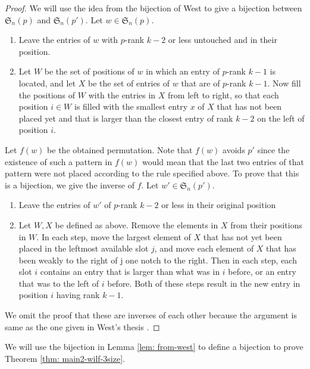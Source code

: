 \documentclass[12pt, english, a4paper]{article}
\newcommand{\Av}{\mathfrak{S}}
\theoremstyle{plain}
\theoremstyle{definition}
\theoremstyle{remark}
\begin{document}
\begin{proof}
     We will use the idea from the bijection of West \cite{west-thesis} to give a bijection between $\Av_n(p)$ and $\Av_n(p')$. Let $w\in \Av_n(p)$. 
    \begin{enumerate}
        \item[Step 1:] Leave the entries of $w$ with $p$-rank $k-2$ or less untouched and in their position.
        \item[Step 2:] Let $W$ be the set of positions of $w$ in which an entry of $p$-rank $k-1$ is located, and let $X$ be the set of entries of $w$ that are of $p$-rank $k-1$. Now fill the positions of $W$ with the entries in $X$ from left to right, so that each position $i \in W$ is filled with the smallest entry $x$ of $X$ that has not been placed yet and that is larger than the closest entry of rank $k-2$ on the left of position $i$.
    \end{enumerate}  Let $f(w)$ be the obtained permutation. Note that $f(w)$ avoids $p'$ since the existence of such a pattern in $f (w)$ would mean that the last two entries of that pattern were not placed according to the rule specified above. To prove that this is a bijection, we give the inverse of $f$.
    Let $w' \in \Av_n(p')$.

    \begin{enumerate}
        \item[Step 1:] Leave the entries of $w'$ of $p$-rank $k-2$ or less in their original position 
        \item[Step 2:] Let $W,X$ be defined as above. Remove the elements in $X$ from their positions in $W$. In each step, move the largest element of $X$ that has not yet been placed in the leftmost available slot $j$, and move each element of $X$ that has been weakly to the right of j one notch to the right. Then in each step, each slot $i$ contains an entry that is larger than what was in $i$ before, or an entry that was to the left of $i$ before. Both of these steps result in the new entry in position $i$ having rank $k-1$.
    \end{enumerate}

We omit the proof that these are inverses of each other because the argument is same as the one given in West's thesis \cite{west-thesis}.
\end{proof}

We will use the bijection in Lemma \ref{lem: from-west} to define a bijection to prove Theorem \ref{thm: main2-wilf-3size}.
\end{document}
